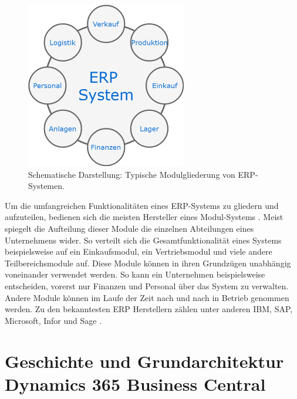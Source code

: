 \pagebreak

\begin{figure}[h]
	\centering
	\includegraphics[width=70mm]{images/ERPModules.png}
	\caption{Schematische Darstellung: Typische Modulgliederung von ERP-Systemen.}
	\label{fig:Modulisierung}
\end{figure}

Um die umfangreichen Funktionalitäten eines ERP-Systems zu gliedern und aufzuteilen, bedienen sich die meisten Hersteller eines Modul-Systems \cite{studebaker2007programming}. Meist spiegelt die Aufteilung dieser Module die einzelnen Abteilungen eines Unternehmens wider. So verteilt sich die Gesamtfunktionalität eines Systems beispielsweise auf ein Einkaufsmodul, ein Vertriebsmodul und viele andere Teilbereichsmodule auf. 
Diese Module können in ihren Grundzügen unabhängig voneinander verwendet werden. So kann ein Unternehmen beispielsweise entscheiden, vorerst nur Finanzen und Personal über das System zu verwalten. Andere Module können im Laufe der Zeit nach und nach in Betrieb genommen werden. Zu den bekanntesten ERP Herstellern zählen unter anderen IBM, SAP, Microsoft, Infor und Sage \cite{hoque2015}.

\pagebreak
\section{Geschichte und Grundarchitektur Dynamics 365 Business Central}
\label{sec:Grundarchitektur Dynamics 365 Business Central}

